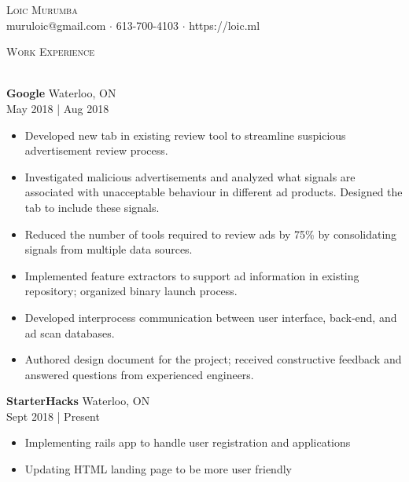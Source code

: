 \documentclass[a4paper]{article}
\newcommand{\lineunder} {
    \vspace*{-8pt} \\
    \hspace*{-18pt} \hrulefill \\
}
\newcommand{\header} [1] {
    {\hspace*{-18pt}\vspace*{6pt} \textsc{#1}}
    \vspace*{-6pt} \lineunder
}
\begin{document}
\vspace*{-40pt}

    

\vspace*{-10pt}
\begin{center}
	{\Huge \scshape {Loic Murumba}}\\
	muruloic@gmail.com $\cdot$ 613-700-4103 $\cdot$ https://loic.ml\\
\end{center}

\header{Work Experience}
\vspace{1mm}

\textbf{Google} \hfill Waterloo, ON\\
 \hfill May 2018 | Aug 2018\\
\vspace{-1mm}
\begin{itemize} \itemsep 1pt
	\item Developed new tab in existing review tool to streamline suspicious advertisement review process.
    \item Investigated malicious advertisements and analyzed what signals are associated with unacceptable behaviour in different ad products. Designed the tab to include these signals.
    \item Reduced the number of tools required to review ads by 75\% by consolidating signals from multiple data sources.
	\item Implemented feature extractors to support ad information in existing repository; organized binary launch process.
	\item Developed interprocess communication between user interface, back-end, and ad scan databases.
	\item Authored design document for the project; received constructive feedback and answered questions from experienced engineers.
\end{itemize}

\textbf{StarterHacks} \hfill Waterloo, ON\\
 \hfill Sept 2018 | Present\\
\vspace{-1mm}
\begin{itemize} \itemsep 1pt
    \item Implementing rails app to handle user registration and applications
    \item Updating HTML landing page to be more user friendly
\end{itemize}
\end{document}
